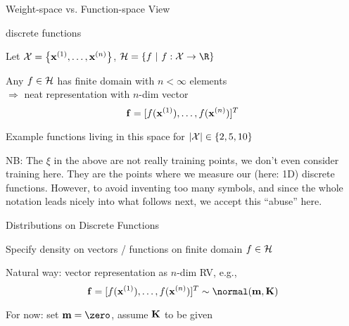 \documentclass[11pt,compress,t,notes=noshow, xcolor=table]{beamer}
\begin{document}
\begin{frame2}{Weight-space vs. Function-space View}
\end{frame2}

\begin{framei}{discrete functions}
\item Let $\mathcal{X} = \left\{ \mathbf{x}^{(1)}, \ldots, \mathbf{x}^{(n)}\right\}$, $\Hspace = \{f ~|~ f: \Xspace \rightarrow \R\}$
\item Any $f \in \mathcal{H}$ has finite domain with $n < \infty$ elements \\$\Rightarrow$ neat representation with $n$-dim vector 
$$\mathbf{f} = [f(\mathbf{x}^{(1)}), \dots, f(\mathbf{x}^{(n)})]^T$$
\item Example functions living in this space for $|\mathcal{X}| \in \{2, 5, 10\}$
\vfill
{}

\item \footnotesize{NB: The $\xi$ in the above are not really training points, we don't even consider training here. They are the points where we measure our (here: 1D) discrete functions. However, to avoid inventing too many symbols, and since the whole notation leads nicely into what follows next, we accept this ``abuse'' here.}  

\end{framei}

\begin{framei}[sep=L]{Distributions on Discrete Functions}
\item Specify density on vectors / functions on finite domain $f \in \mathcal{H}$ 
\item Natural way: vector representation as $n$-dim RV, e.g.,
$$\fv = \fvec^T \sim \Nmk$$
\item For now: set $\mv = \zero$, assume $\mathbf{K}$ to be given
\end{framei}
\end{document}
